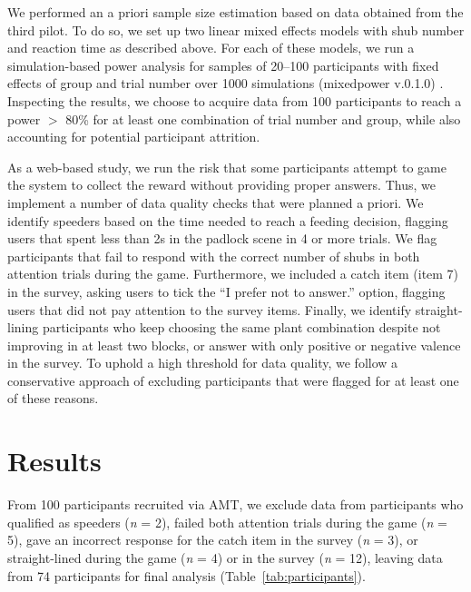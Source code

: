 We performed an a priori sample size estimation based on data obtained from the third pilot. 
To do so, we set up two linear mixed effects models with shub number and reaction time as described above. 
For each of these models, we run a simulation-based power analysis for samples of 20--100 participants with fixed effects of group and trial number over 1000 simulations (mixedpower v.0.1.0) \citep{kumle_estimating_2021}. 
Inspecting the results, we choose to acquire data from 100 participants to reach a power $>$ 80\% for at least one combination of trial number and group, while also accounting for potential participant attrition.

As a web-based study, we run the risk that some participants attempt to game the system to collect the reward without providing proper answers. 
Thus, we implement a number of data quality checks that were planned a priori.
We identify speeders based on the time needed to reach a feeding decision, flagging users that spent less than 2s in the padlock scene in 4 or more trials.
We flag participants that fail to respond with the correct number of shubs in both attention trials during the game.
Furthermore, we included a catch item (item 7) in the survey, asking users to tick the ``I prefer not to answer.'' option, flagging users that did not pay attention to the survey items.
Finally, we identify straight-lining participants who keep choosing the same plant combination despite not improving in at least two blocks, or answer with only positive or negative valence in the survey.
To uphold a high threshold for data quality, we follow a conservative approach of excluding participants that were flagged for at least one of these reasons.

\section{Results}\label{sec:results}

From 100 participants recruited via \gls{AMT}, we exclude data from participants who qualified as speeders (\textit{n} = 2), failed both attention trials during the game (\textit{n} = 5), gave an incorrect response for the catch item in the survey (\textit{n} = 3), or straight-lined during the game (\textit{n} = 4) or in the survey (\textit{n} = 12), leaving data from 74 participants for final analysis (Table~\ref{tab:participants}).

